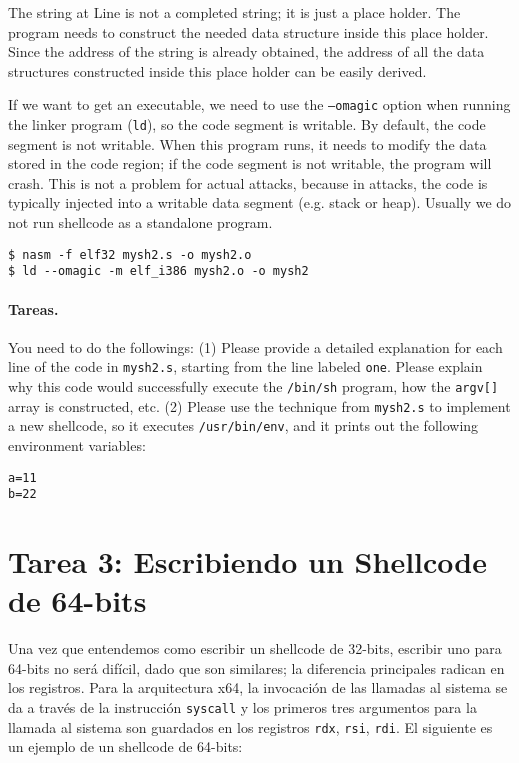 The string at Line  is not a completed string; it 
is just a place holder. 
The program needs to construct the needed data structure
inside this place holder. Since the address of the string
is already obtained, the address of all the data 
structures constructed inside this place holder can
be easily derived. 


If we want to get an executable, we need to use 
the \texttt{--omagic} option when running the 
linker program (\texttt{ld}), so 
the code segment is writable. 
By default, the code segment is not writable.
When this program runs, it needs to modify the data stored
in the code region; if the code segment is not 
writable, the program will crash. 
This is not a problem for actual attacks, because
in attacks, the code is typically injected into a writable data 
segment (e.g. stack or heap). Usually we do not run shellcode 
as a standalone program. 


\begin{lstlisting}
$ nasm -f elf32 mysh2.s -o mysh2.o
$ ld --omagic -m elf_i386 mysh2.o -o mysh2
\end{lstlisting}


\paragraph{Tareas.} You need to do the followings:
(1) Please provide a detailed explanation for each line of the 
code in \texttt{mysh2.s}, starting from the line labeled \texttt{one}.
Please explain why this code would successfully execute 
the \texttt{/bin/sh} program, how the \texttt{argv[]} array is
constructed, etc. 
(2) Please use the technique from \texttt{mysh2.s} to 
implement a new shellcode, so it 
executes \texttt{/usr/bin/env}, and it prints out 
the following environment variables: 

\begin{lstlisting}
a=11
b=22
\end{lstlisting}


\section{Tarea 3: Escribiendo un Shellcode de 64-bits}

Una vez que entendemos como escribir un shellcode de 32-bits, escribir uno para 64-bits no será difícil, dado que son similares; la diferencia principales radican en los registros.
Para la arquitectura x64, la invocación de las llamadas al sistema se da a través de la instrucción \texttt{syscall} y los primeros tres argumentos para la llamada al sistema son guardados en los registros \texttt{rdx}, \texttt{rsi}, 
\texttt{rdi}.
El siguiente es un ejemplo de un shellcode de 64-bits:

